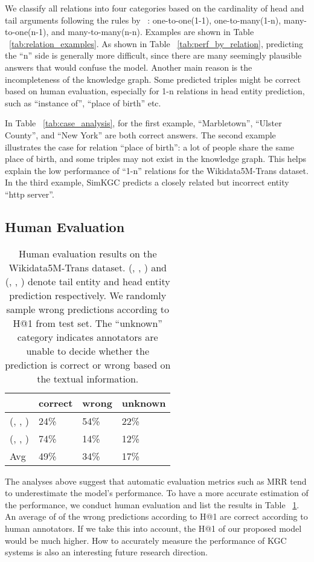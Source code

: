 \documentclass[11pt]{article}
\begin{document}
We classify all relations into four categories
based on the cardinality of head and tail arguments
following the rules by ~\citet{bordes2013translating}:
one-to-one(1-1),
one-to-many(1-n),
many-to-one(n-1),
and many-to-many(n-n).
Examples are shown in Table ~\ref{tab:relation_examples}.
As shown in Table ~\ref{tab:perf_by_relation},
predicting the ``n'' side is generally more difficult,
since there are many seemingly plausible answers
that would confuse the model.
Another main reason is the incompleteness of the knowledge graph.
Some predicted triples might be correct based on human evaluation,
especially for 1-n relations in head entity prediction,
such as ``instance of'', ``place of birth'' etc.

In Table ~\ref{tab:case_analysis},
for the first example,
``Marbletown'', ``Ulster County'', and ``New York'' are both correct answers.
The second example illustrates the case for relation ``place of birth'':
a lot of people share the same place of birth,
and some triples may not exist in the knowledge graph.
This helps explain the low performance of ``1-n'' relations for the Wikidata5M-Trans dataset.
In the third example,
SimKGC predicts a closely related but incorrect entity ``http server''.

\subsection{Human Evaluation}

\begin{table}[ht]
\centering
\begin{tabular}{l|lll}
\hline
         & correct & wrong & unknown \\ \hline
(, , )  & 24\% & 54\% & 22\% \\
(, , ) & 74\% & 14\% & 12\% \\
Avg   & 49\%  & 34\% & 17\% \\ \hline
\end{tabular}
\caption{Human evaluation results on the Wikidata5M-Trans dataset.
(, , ) and (, , ) denote tail entity and head entity prediction respectively.
We randomly sample  wrong predictions according to H@1 from test set.
The ``unknown'' category indicates annotators are unable to decide
whether the prediction is correct or wrong
based on the textual information.}
\label{tab:human_eval}
\end{table}

The analyses above suggest that
automatic evaluation metrics such as MRR tend to underestimate the model's performance.
To have a more accurate estimation of the performance,
we conduct human evaluation and list the results in Table ~\ref{tab:human_eval}.
An average of  of the wrong predictions according to H@1 are correct according to human annotators.
If we take this into account,
the H@1 of our proposed model would be much higher.
How to accurately measure the performance of KGC systems
is also an interesting future research direction.
\end{document}
